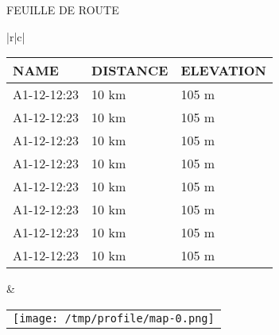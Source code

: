 \documentclass[english,ms,10pt]{memoir}
\begin{document}
\begin{center}
  FEUILLE DE ROUTE
\end{center}
\begin{tabular}[b]{|r|c|}
  \hline
  \\
    \hline
  \begin{tabular}{|l|l|l|}
    \hline
    NAME & DISTANCE & ELEVATION  \\
    \hline
    A1-12-12:23 & 10 km & 105 m \\
    A1-12-12:23 & 10 km & 105 m \\
    A1-12-12:23 & 10 km & 105 m \\
    A1-12-12:23 & 10 km & 105 m \\
    A1-12-12:23 & 10 km & 105 m \\
    A1-12-12:23 & 10 km & 105 m \\
    A1-12-12:23 & 10 km & 105 m \\
    A1-12-12:23 & 10 km & 105 m \\
    \hline
  \end{tabular} 
  &
  \begin{tabular}{r}
    \texttt{[image: /tmp/profile/map-0.png]}
  \end{tabular} \\
  \hline
\end{tabular}
\end{document}
